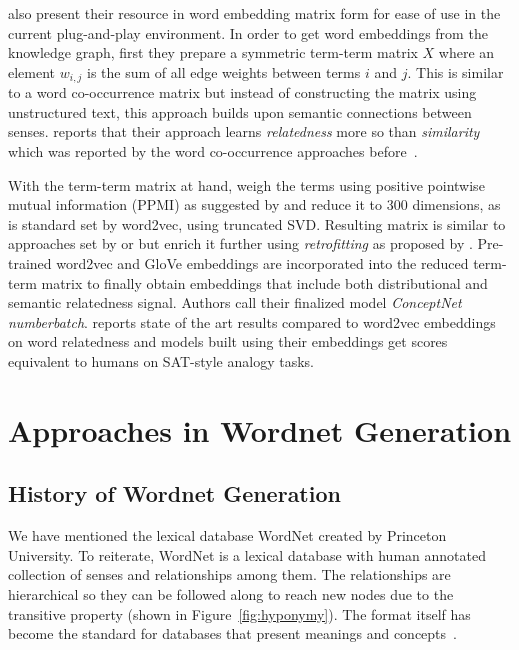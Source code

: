 \citeauthor{speer_conceptnet_2017} also present their resource in word embedding matrix form for ease of use in the current plug-and-play environment.
In order to get word embeddings from the knowledge graph, first they prepare a symmetric term-term matrix $X$ where an element $w_{i,j}$ is the sum of all edge weights between terms $i$ and $j$.
This is similar to a word co-occurrence matrix but instead of constructing the matrix using unstructured text, this approach builds upon semantic connections between senses.
\citeauthor{speer_conceptnet_2017} reports that their approach learns \emph{relatedness} more so than \emph{similarity} which was reported by the word co-occurrence approaches before~\cite{lund_producing_1996}.

With the term-term matrix at hand, \citeauthor{speer_conceptnet_2017} weigh the terms using positive pointwise mutual information (PPMI) as suggested by \textcite{levy_improving_2015} and reduce it to 300 dimensions, as is standard set by word2vec, using truncated SVD\@.
Resulting matrix is similar to approaches set by \textcite{deerwester_indexing_1990} or \textcite{pennington_glove_2014} but \citeauthor{speer_conceptnet_2017} enrich it further using \emph{retrofitting} as proposed by \textcite{faruqui_improving_2014}.
Pre-trained word2vec and GloVe embeddings are incorporated into the reduced term-term matrix to finally obtain embeddings that include both distributional and semantic relatedness signal.
Authors call their finalized model \emph{ConceptNet numberbatch}.
\citeauthor{speer_conceptnet_2017} reports state of the art results compared to word2vec embeddings on word relatedness and models built using their embeddings get scores equivalent to humans on SAT-style analogy tasks.


\section{Approaches in Wordnet Generation}%
\label{sec:approaches_in_wordnet_generation}

\subsection{History of Wordnet Generation}%
\label{sub:history_of_wordnet_generation}

We have mentioned the lexical database WordNet created by Princeton University.
To reiterate, WordNet is a lexical database with human annotated collection of senses and relationships among them.
The relationships are hierarchical so they can be followed along to reach new nodes due to the transitive property (shown in Figure~\ref{fig:hyponymy}).
The format itself has become the standard for databases that present meanings and concepts~\cite{neale_survey_2018}.

